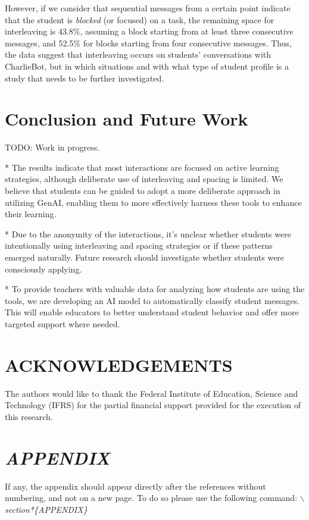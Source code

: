 \documentclass[a4paper,twoside]{article}
\begin{document}
However, if we consider that sequential messages from a certain point indicate
that the student is \textit{blocked} (or focused) on a task, the remaining space
for interleaving is 43.8\%, assuming a block starting from at least three
consecutive messages, and 52.5\% for blocks starting from four consecutive
messages. Thus, the data suggest that interleaving occurs on students'
conversations with CharlieBot, but in which situations and with what type of
student profile is a study that needs to be further investigated.

\section{Conclusion and Future Work}

TODO: Work in progress.

* The results indicate that most interactions are focused on active learning
strategies, although deliberate use of interleaving and spacing is limited. We
believe that students can be guided \cite{Zheng19} \cite{Wang23} \cite{LiWei23}
\cite{Khusnul24} to adopt a more deliberate approach in utilizing GenAI,
enabling them to more effectively harness these tools to enhance their learning.

* Due to the anonymity of the interactions, it's unclear whether
students were intentionally using interleaving and spacing strategies or if
these patterns emerged naturally. Future research should investigate whether
students were consciously applying.

* To provide teachers with valuable data for analyzing how students are using
the tools, we are developing an AI model to automatically classify student
messages. This will enable educators to better understand student behavior and
offer more targeted support where needed.

\section*{ACKNOWLEDGEMENTS}

The authors would like to thank the Federal Institute of Education, Science and
Technology (IFRS) for the partial financial support provided for the execution
of this research.


{\small
}

\section*{\uppercase{\textit{Appendix}}}

If any, the appendix should appear directly after the
references without numbering, and not on a new page. To do so please use the
following command: \textit{$\backslash$section*\{APPENDIX\}}
\end{document}
